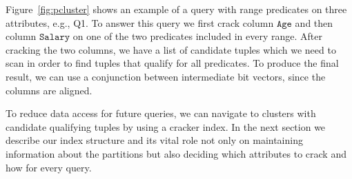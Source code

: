 Figure~\ref{fig:pcluster} shows an example of a query with range predicates on three attributes, e.g., Q1.
To answer this query we first crack column $\mathtt{Age}$ and then column $\mathtt{Salary}$ on one of the two predicates included in every range.
After cracking the two columns, we have a list of candidate tuples which we need to scan in order to find tuples that qualify for all predicates.
To produce the final result, we can use a conjunction between intermediate bit vectors, since the columns are aligned.

To reduce data access for future queries, we can navigate to clusters with candidate qualifying tuples by using a cracker index.
In the next section we describe our index structure and its vital role not only on maintaining information about the partitions but also deciding which attributes to crack and how for every query.
